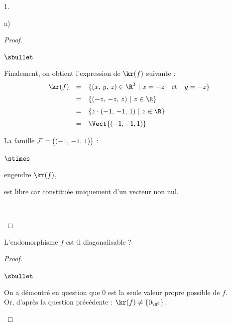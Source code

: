 \documentclass[11pt]{article}%
\begin{document}
\begin{noliste}{1.}
\begin{noliste}{a)}
\begin{proof}
\begin{noliste}{$\sbullet$}
	
	\newpage
	
	
        \noindent
	Finalement, on obtient l'expression de $\kr(f)$ suivante :
	\[
        \begin{array}{rcl}
          \kr(f) & = &  \{ (x, \, y, \, z) \in \R^3 \ | \ x = -z \quad
          \text{et} \quad y = -z \}
          \\[.2cm]
          & = &  \{(-z, \, -z, \, z) \ | \ z \in \R\}
          \\[.2cm]
          & = &  \{ z \cdot (-1, \, -1, \, 1) \ | \ z \in \R\}
          \\[.2cm]
          & = &  \Vect{(-1, -1, 1)}
        \end{array}
	\]

      \item La famille ${\cal F} = \big( (-1, \, -1, \, 1)\big)$ :
	\begin{noliste}{$\stimes$}
        \item engendre $\kr(f)$,
        \item est libre car constituée uniquement d'un vecteur non
          nul.
	\end{noliste}
	~\\[-1.6cm]
      \end{noliste}
    \end{proof}
    
  \item L'endomorphisme $f$ est-il diagonalisable ?

    \begin{proof}~%
      \begin{noliste}{$\sbullet$}
      \item On a démontré en question  que $0$ est la seule
        valeur propre possible de $f$.\\
        Or, d'après la question précédente : $\kr(f) \neq \{ 0_{\R^3}
        \}$. %


\end{noliste}
\end{proof}
\end{noliste}
\end{noliste}
\end{document}
